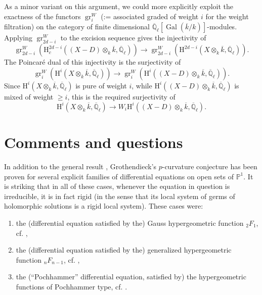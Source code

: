As a minor variant on this argument, we could more explicitly exploit the exactness of the functors \(\operatorname{gr}^W_i\) (:= associated graded of weight \(i\) for the weight filtration) on the category of finite dimensional \(\overline{\mathbb{Q}}_\ell[\operatorname{Gal}(\overline{k}/k)]\)-modules. Applying \(\operatorname{gr}^W_{2d-i}\) to the excision sequence gives the injectivity of
\[
\operatorname{gr}^W_{2d-i}(\mathrm{H}^{2d-i}_c((X-D)\otimes_k\overline{k},\overline{\mathbb{Q}}_\ell))
\to
\operatorname{gr}^W_{2d-i}(\mathrm{H}^{2d-i}(X\otimes_k\overline{k},\overline{\mathbb{Q}}_\ell)).
\]
The Poincaré dual of this injectivity is the surjectivity of
\[
\operatorname{gr}^W_i(\mathrm{H}^i(X\otimes_k\overline{k},\overline{\mathbb{Q}}_\ell))
\to
\operatorname{gr}^W_i(\mathrm{H}^i((X-D)\otimes_k\overline{k},\overline{\mathbb{Q}}_\ell)).
\]
Since \(\mathrm{H}^i(X\otimes_k\overline{k},\overline{\mathbb{Q}}_\ell)\) is pure of weight \(i\), while \(\mathrm{H}^i((X-D)\otimes_k\overline{k},\overline{\mathbb{Q}}_\ell)\) is mixed of weight \(\geq i\), this is the required surjectivity of
\[
\mathrm{H}^i(X\otimes_k\overline{k},\overline{\mathbb{Q}}_\ell)
\to W_i\mathrm{H}^i((X-D)\otimes_k\overline{k},\overline{\mathbb{Q}}_\ell).
\]

\section{Comments and questions}
\label{sec:9.5}

In addition to the general result \cite[5.7]{Ka-ASDE}, Grothendieck's \(p\)-curvature conjecture has been proven for several explicit families of differential equations on open sets of \(\mathbb{P}^1\). It is striking that in all of these cases, whenever the equation in question is irreducible, it is in fact rigid (in the sense that its local system of germs of holomorphic solutions is a rigid local system). These cases were:
\begin{enumerate}[label=(\arabic*)]
\item the (differential equation satisfied by the) Gauss hypergeometric function \({}_2F_1\), cf. \cite[6.2 and 6.9.4]{Ka-ASDE},
\item the (differential equation satisfied by the) generalized hypergeometric function \({}_nF_{n-1}\), cf. \cite[4.8 and 4.9]{B-H},
\item the (``Pochhammer'' differential equation, satisfied by) the hypergeometric functions of Pochhammer type, cf. \cite[Theorems~1.2, 1.3, 2.1]{Har}.
\end{enumerate}

